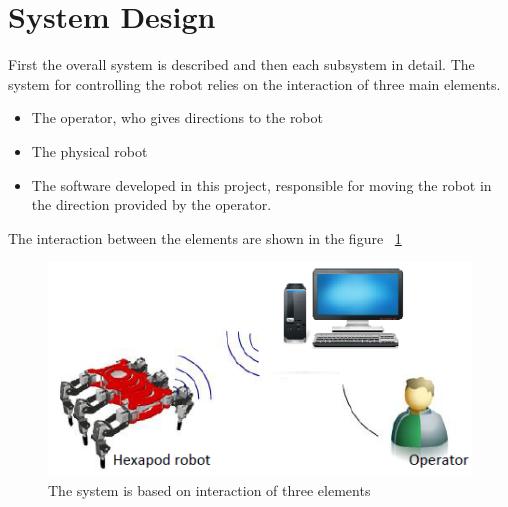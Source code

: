 \documentclass{report}
\begin{document}
\section{System Design}
 First the overall system is described and then each
subsystem in detail. The system for controlling the robot relies on the interaction of three main elements.
\begin{itemize}
\item The operator, who gives directions to the robot
\item The physical robot
\item The software developed in this project, responsible for moving the robot in the direction provided by the operator.
\end{itemize}
The interaction between the elements are shown in the figure ~\ref{fig32}
\begin{figure}[h!]
\centering
\includegraphics[scale=1]{threeelements}
\caption{The system is based on interaction of three elements}
\label{fig32}
\end{figure}
\end{document}

